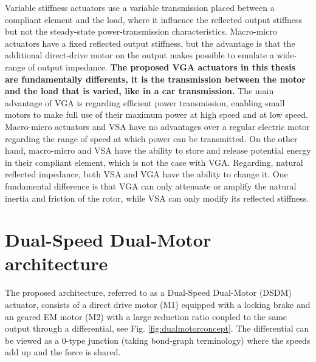 Variable stiffness actuators use a variable transmission placed between a compliant element and the load, where it influence the reflected output stiffness but not the steady-state power-transmission characteristics. Macro-micro actuators have a fixed reflected output stiffness, but the advantage is that the additional direct-drive motor on the output makes possible to emulate a wide-range of output impedance. \textbf{The proposed VGA actuators in this thesis are fundamentally differents, it is the transmission between the motor and the load that is varied, like in a car transmission.} The main advantage of VGA is regarding efficient power transmission, enabling small motors to make full use of their maximum power at high speed and at low speed. Macro-micro actuators and VSA have no advantages over a regular electric motor regarding the range of speed at which power can be transmitted. On the other hand, macro-micro and VSA have the ability to store and release potential energy in their compliant element, which is not the case with VGA. Regarding, natural reflected impedance, both VSA and VGA have the ability to change it. One fundamental difference is that VGA can only attenuate or amplify the natural inertia and friction of the rotor, while VSA can only modify its reflected stiffness. 







\newpage

\section{Dual-Speed Dual-Motor architecture}
\label{sec:DSDM}

The proposed architecture, referred to as a Dual-Speed Dual-Motor (DSDM) actuator, consists of a direct drive motor (M1) equipped with a locking brake and an geared EM motor (M2) with a large reduction ratio coupled to the same output through a differential, see Fig. \ref{fig:dualmotorconcept}. The differential can be viewed as a 0-type junction (taking bond-graph terminology) where the speeds add up and the force is shared. 


